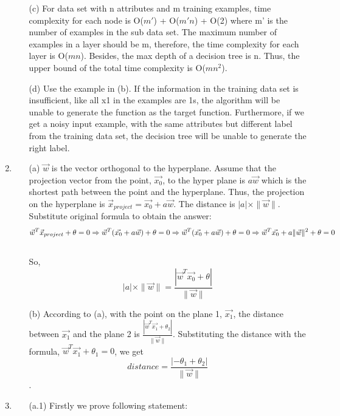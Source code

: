 \begin{enumerate}
\begin{itemize}
\item[(c)] 
For data set with n attributes and m training examples, time complexity for each node is O($m'$) + O($m'n$) + O(2) where m' is the number of examples in the sub data set. The maximum number of examples in a layer should be m, therefore, the time complexity for each layer is O($mn$). Besides, the max depth of a decision tree is n. Thus, the upper bound of the total time complexity is O($mn^2$). 
\item[(d)] 
Use the example in (b). If the information in the training data set is insufficient, like all x1 in the examples are 1s, the algorithm will be unable to generate the function as the target function. Furthermore, if we get a noisy input example, with the same attributes but different label from the training data set, the decision tree will be unable to generate the right label.
\end{itemize}
\item \begin{itemize}
\item[(a)] 
$\vec{w}$ is the vector orthogonal to the hyperplane. Assume that the projection vector from the point, $\vec{x_{0}}$, to the hyper plane is  $a \vec{w}$ which is the shortest path between the point and the hyperplane. Thus, the projection on the hyperplane is $\vec{x }_{project} = \vec{x_{0} } + a \vec{w}$. The distance is $|a|\times\|\vec{w}\| $. Substitute original formula to obtain the answer: \\  \[\vec{w}^{T}\vec{x }_{project}  + \theta = 0  \\\Rightarrow \vec{w}^{T} ( \vec{x_{0}}  + a \vec{w} )+ \theta = 0 \Rightarrow \vec{w}^{T}( \vec{x_{0} } + a \vec{w} ) + \theta = 0 \Rightarrow  \vec{w}^{T}\vec{x_{0} } + a \|\vec{w} \|^{2} + \theta = 0  \]
\\ So, 
\[|a|\times\|\vec{w}\| =  \frac{ |\vec{w}^{T} \vec{x_{0} } + \theta |} {\|\vec{w}\|}\]
\item[(b)] 
According to (a), with the point on the plane 1, $\vec{x_{1} }$, the distance between $\vec{x_{1} }$ and the plane 2 is $ \frac{ |\vec{w}^{T} \vec{x_{1} } + \theta_{2} |} {\|\vec{w}\|}$. Substituting the distance with the formula, $\vec{w}^{T} \vec{x_{1} }+ \theta_{1} = 0$, we get \[distance = \frac{ |-\theta_{1}+ \theta_{2} |} {\|\vec{w}\|}\]. 
\end{itemize}
\clearpage
\item 
\begin{itemize}
\item[(a.1)] Firstly we prove following statement:

\end{itemize}
\end{enumerate}
